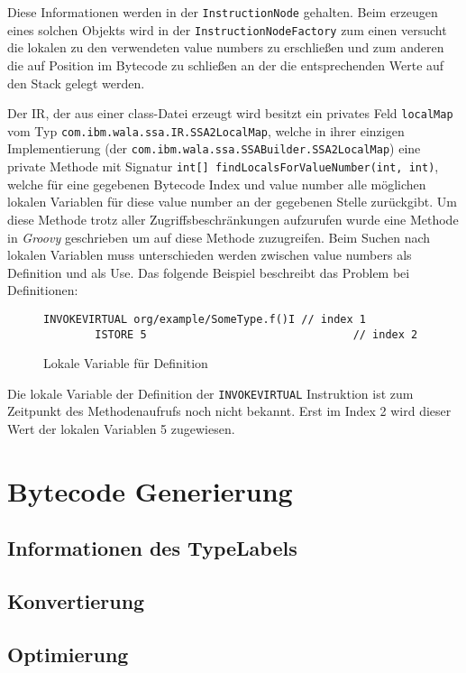 Diese Informationen werden in der \texttt{InstructionNode} gehalten. Beim erzeugen 
eines solchen Objekts wird in der \texttt{InstructionNodeFactory} zum einen versucht
die lokalen zu den verwendeten value numbers zu erschließen und zum anderen die auf 
Position im Bytecode zu schließen an der die entsprechenden Werte auf den Stack gelegt 
werden.

Der IR, der aus einer class-Datei erzeugt wird besitzt ein privates Feld \texttt{localMap}
vom Typ \texttt{com.ibm.wala.ssa.IR.SSA2LocalMap}, welche in ihrer einzigen Implementierung
(der \texttt{com.ibm.wala.ssa.SSABuilder.SSA2LocalMap}) eine private Methode mit 
Signatur \texttt{int[] findLocalsForValueNumber(int, int)}, welche für eine gegebenen 
Bytecode Index und value number alle möglichen lokalen Variablen für diese value number 
an der gegebenen Stelle zurückgibt. Um diese Methode trotz aller Zugriffsbeschränkungen 
aufzurufen wurde eine Methode in \textit{Groovy} geschrieben um auf diese Methode 
zuzugreifen. Beim Suchen nach lokalen Variablen muss unterschieden werden zwischen 
value numbers als Definition und als Use. Das folgende Beispiel beschreibt das Problem 
bei Definitionen:

\begin{figure}[H]
	\begin{lstlisting}[language=Bytecode]
		INVOKEVIRTUAL org/example/SomeType.f()I // index 1
		ISTORE 5								// index 2
	\end{lstlisting}
	\caption{Lokale Variable für Definition}
\end{figure}

Die lokale Variable der Definition der \texttt{INVOKEVIRTUAL} Instruktion ist zum
Zeitpunkt des Methodenaufrufs noch nicht bekannt. Erst im Index 2 wird dieser Wert der 
lokalen Variablen 5 zugewiesen.



\section{Bytecode Generierung}

\subsection{Informationen des TypeLabels}
\label{ssec:infoLabel}

\subsection{Konvertierung}

\subsection{Optimierung}